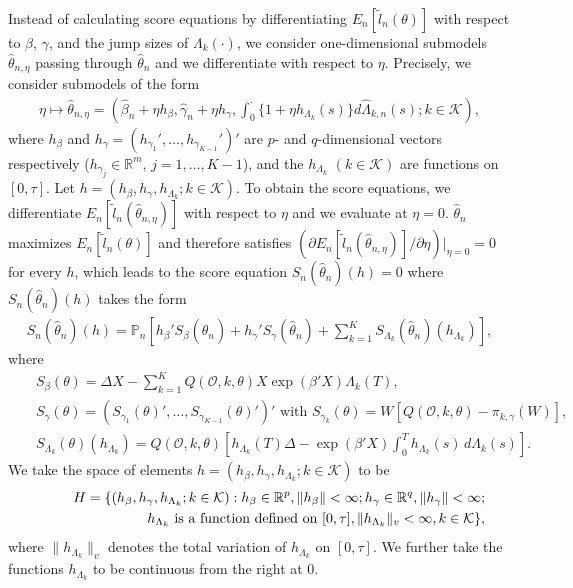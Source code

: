 \documentclass{statsoc}
\begin{document}
Instead of calculating score equations by differentiating $E_n[\widetilde l_n(\theta)]$ with respect to $\beta$, $\gamma$, and the jump sizes of $\Lambda_k(\cdot)$, we consider one-dimensional submodels $\widehat\theta_{n,\eta}$ passing through $\widehat\theta_n$ and we differentiate with respect to $\eta$. Precisely, we consider submodels of the form
\begin{eqnarray*}
\eta\mapsto \widehat\theta_{n,\eta}=\left(\widehat\beta_n+\eta h_\beta,\widehat\gamma_n+\eta h_\gamma, \int_0^\cdot \{1+\eta h_{\Lambda_k}(s)\}d\widehat\Lambda_{k,n}(s); k\in\mathcal K\right),
\end{eqnarray*}
where $h_\beta$ and $h_\gamma=(h_{\gamma_1}',\ldots,h_{\gamma_{K-1}}')'$ are $p$- and $q$-dimensional vectors respectively ($h_{\gamma_j}\in\mathbb R^m$, $j=1,\ldots,K-1$), and the $h_{\Lambda_k}$ $(k\in\mathcal K)$ are functions on $[0,\tau]$. Let $h=(h_\beta, h_\gamma, h_{\Lambda_k}; k\in\mathcal K)$. To obtain the score equations, we differentiate $E_n[\widetilde l_n(\widehat\theta_{n,\eta})]$ with respect to $\eta$ and we evaluate at $\eta=0$. $\widehat\theta_n$ maximizes $E_n[\widetilde l_n(\theta)]$ and therefore satisfies $(\partial E_n[\widetilde l_n(\widehat\theta_{n,\eta})]\slash\partial\eta)\left.\right|_{\eta=0}=0$ for every $h$, which leads to the score equation $S_n(\widehat\theta_n)(h)=0$ where $S_n(\widehat\theta_n)(h)$ takes the form
\begin{eqnarray}\label{score}
S_n(\widehat\theta_n)(h)=\mathbb P_n\left[h_\beta' S_\beta(\widehat\theta_n)+ h_\gamma' S_\gamma(\widehat\theta_n)+\sum_{k=1}^K S_{\Lambda_k}(\widehat\theta_n)(h_{\Lambda_k})\right],
\end{eqnarray}
where
\begin{eqnarray*}
&&S_\beta(\theta)=\Delta X-\sum_{k=1}^K Q(\mathcal O,k,\theta)X\exp(\beta'X)\Lambda_k(T),\\
&&S_\gamma(\theta)=(S_{\gamma_1}(\theta)',\ldots,S_{\gamma_{K-1}}(\theta)')' \mbox{ with } S_{\gamma_k}(\theta)=W\left[Q(\mathcal O,k,\theta)-\pi_{k,\gamma}(W)\right],\\
&&S_{\Lambda_k}(\theta)(h_{\Lambda_k})=Q(\mathcal O,k,\theta)\left[h_{\Lambda_k}(T)\Delta-\exp(\beta'X)\int_0^{T}h_{\Lambda_k}(s)\,d\Lambda_k(s)\right].
\end{eqnarray*}
We take the space of elements $h=(h_\beta, h_\gamma, h_{\Lambda_k}; k\in\mathcal K)$ to be
\begin{eqnarray*}
&&H=\{(h_\beta, h_\gamma, h_{\Lambda_k}; k\in\mathcal K): h_\beta\in{\ensuremath{\mathbb{R}}}^p, \|h_\beta\|<\infty; h_\gamma\in{\ensuremath{\mathbb{R}}}^q, \|h_\gamma\|<\infty;  \\
&&\hspace{2.5cm}h_{\Lambda_k} \mbox{ is a function defined on } [0,\tau], \|h_{\Lambda_k}\|_v<\infty, k\in\mathcal K\},
\end{eqnarray*}
where $\|h_{\Lambda_k}\|_v$ denotes the total variation of $h_{\Lambda_k}$ on $[0,\tau]$. We further take the functions $h_{\Lambda_k}$ to be continuous from the right at 0.
\end{document}
